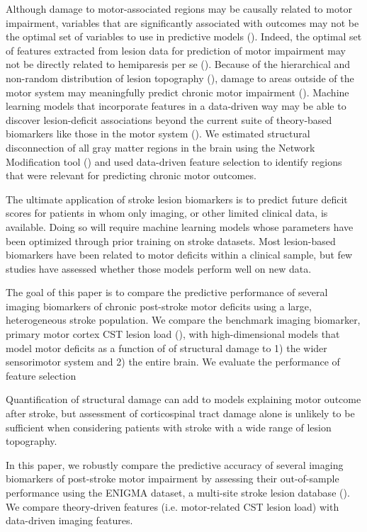 \documentclass[10pt]{article}
\begin{document}
Although damage to motor-associated regions may be causally related to motor impairment, variables that are significantly associated with outcomes may not be the optimal set of variables to use in predictive models (\cite{Bzdok2020-py}). Indeed, the optimal set of features extracted from lesion data for prediction of motor impairment may not be directly related to hemiparesis per se (\cite{Sperber2021-lw}). Because of the hierarchical and non-random distribution of lesion topography (\cite{Mah2014-cb,Wang2019-dz}), damage to areas outside of the motor system may meaningfully predict chronic motor impairment (\cite{Sperber2021-lw}). Machine learning models that incorporate features in a data-driven way may be able to discover lesion-deficit associations beyond the current suite of theory-based biomarkers like those in the motor system (\cite{Kasties2021-rm, Calesella2021-kp}). We estimated structural disconnection of all gray matter regions in the brain using the Network Modification tool (\cite{Kuceyeski2013-nk}) and used data-driven feature selection to identify regions that were relevant for predicting chronic motor outcomes. 

The ultimate application of stroke lesion biomarkers is to predict future deficit scores for patients in whom only imaging, or other limited clinical data, is available. Doing so will require machine learning models whose parameters have been optimized through prior training on stroke datasets. Most lesion-based biomarkers have been related to motor deficits within a clinical sample, but few studies have assessed whether those models perform well on new data. 

The goal of this paper is to compare the predictive performance of several imaging biomarkers of chronic post-stroke motor deficits using a large, heterogeneous stroke population. We compare the benchmark imaging biomarker, primary motor cortex CST lesion load (\cite{Boyd2017-gs}), with  high-dimensional models that model motor deficits as a function of of structural damage to 1) the wider sensorimotor system and 2) the entire brain. We evaluate the performance of feature selection 


\cite{Park2016-te} Quantification of structural damage can add to models explaining motor outcome after stroke, but assessment of corticospinal tract damage alone is unlikely to be sufficient when considering patients with stroke with a wide range of lesion topography.


In this paper, we robustly compare the predictive accuracy of several imaging biomarkers of post-stroke motor impairment by assessing their out-of-sample performance using the ENIGMA dataset, a multi-site stroke lesion database (\cite{Liew2020-ps}). We compare theory-driven features (i.e. motor-related CST lesion load) with data-driven imaging features. 
\end{document}
